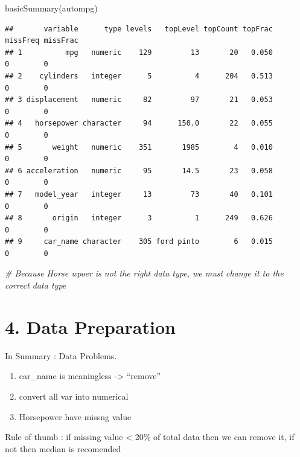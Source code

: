 \documentclass[
]{article}
\newenvironment{Shaded}{\begin{snugshade}}{\end{snugshade}}
\newcommand{\CommentTok}[1]{\textcolor[rgb]{0.56,0.35,0.01}{\textit{#1}}}
\newcommand{\FunctionTok}[1]{\textcolor[rgb]{0.00,0.00,0.00}{#1}}
\newcommand{\NormalTok}[1]{#1}
\providecommand{\tightlist}{%
  \setlength{\itemsep}{0pt}\setlength{\parskip}{0pt}}
\begin{document}
\begin{Shaded}
\begin{Highlighting}[]
\FunctionTok{basicSummary}\NormalTok{(autompg)}
\end{Highlighting}
\end{Shaded}

\begin{verbatim}
##       variable      type levels   topLevel topCount topFrac missFreq missFrac
## 1          mpg   numeric    129         13       20   0.050        0        0
## 2    cylinders   integer      5          4      204   0.513        0        0
## 3 displacement   numeric     82         97       21   0.053        0        0
## 4   horsepower character     94      150.0       22   0.055        0        0
## 5       weight   numeric    351       1985        4   0.010        0        0
## 6 acceleration   numeric     95       14.5       23   0.058        0        0
## 7   model_year   integer     13         73       40   0.101        0        0
## 8       origin   integer      3          1      249   0.626        0        0
## 9     car_name character    305 ford pinto        6   0.015        0        0
\end{verbatim}

\begin{Shaded}
\begin{Highlighting}[]
\CommentTok{\# Because Horse wpoer is not the right data type, we must change it to the correct data type}
\end{Highlighting}
\end{Shaded}

\hypertarget{data-preparation}{%
\section{4. Data Preparation}\label{data-preparation}}

In Summary : Data Problems.

\begin{enumerate}
\def\labelenumi{\arabic{enumi}.}
\tightlist
\item
  car\_name is meaningless -\textgreater{} ``remove''
\item
  convert all var into numerical
\item
  Horsepower have missng value
\end{enumerate}

Rule of thumb : if missing value \textless{} 20\% of total data then we
can remove it, if not then median is recomended
\end{document}
